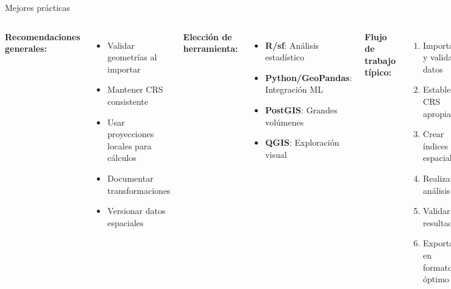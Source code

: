 \documentclass[10pt,aspectratio=169]{beamer}
\begin{document}
\begin{frame}{Mejores prácticas}
    \begin{columns}[T]
        \textbf{Recomendaciones generales:}
        \begin{itemize}
            \item Validar geometrías al importar
            \item Mantener CRS consistente
            \item Usar proyecciones locales para cálculos
            \item Documentar transformaciones
            \item Versionar datos espaciales
        \end{itemize}
        
        \vspace{0.3cm}
        
        \textbf{Elección de herramienta:}
        \begin{itemize}
            \item \textbf{R/sf}: Análisis estadístico
            \item \textbf{Python/GeoPandas}: Integración ML
            \item \textbf{PostGIS}: Grandes volúmenes
            \item \textbf{QGIS}: Exploración visual
        \end{itemize}
        
        \textbf{Flujo de trabajo típico:}
        \begin{enumerate}
            \item Importar y validar datos
            \item Establecer CRS apropiado
            \item Crear índices espaciales
            \item Realizar análisis
            \item Validar resultados
            \item Exportar en formato óptimo
        \end{enumerate}
        
        \vspace{0.3cm}
        
        \begin{tcolorbox}[colframe=usachblue,colback=blue!5]
        \textbf{Tip:} Siempre trabaja con copias de los datos originales y documenta cada transformación.
        \end{tcolorbox}
    \end{columns}
\end{frame}
\end{document}
